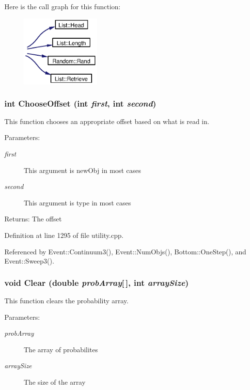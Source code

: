 Here is the call graph for this function:\begin{figure}[H]
\begin{center}
\leavevmode
\includegraphics[width=113pt]{utility_8cpp_a9_cgraph}
\end{center}
\end{figure}
\subsubsection{\setlength{\rightskip}{0pt plus 5cm}int Choose\-Offset (int {\em first}, int {\em second})}\label{utility_8cpp_a18}


This function chooses an appropriate offset based on what is read in. \begin{Desc}
\item[Parameters:]
\begin{description}
\item[{\em first}]This argument is new\-Obj in most cases \item[{\em second}]This argument is type in most cases \end{description}
\end{Desc}
\begin{Desc}
\item[Returns:]The offset \end{Desc}


Definition at line 1295 of file utility.cpp.

Referenced by Event::Continuum3(), Event::Num\-Objs(), Bottom::One\-Step(), and Event::Sweep3().
\subsubsection{\setlength{\rightskip}{0pt plus 5cm}void Clear (double {\em prob\-Array}[$\,$], int {\em array\-Size})}\label{utility_8cpp_a29}


This function clears the probability array. \begin{Desc}
\item[Parameters:]
\begin{description}
\item[{\em prob\-Array}]The array of probabilites \item[{\em array\-Size}]The size of the array \end{description}
\end{Desc}


